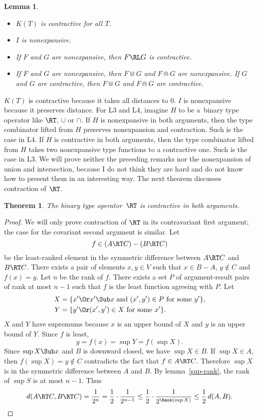 \documentclass{amsart}
\newtheorem{theorem}[subsection]{Theorem}
\newtheorem{lemma}[subsection]{Lemma}
\theoremstyle{definition}
\begin{document}
\begin{samepage}
\begin{lemma}
\label{kisp}
~
\begin{itemize}
\item [L1.] $K(T)$ is contractive for all $T$.
\item [L2.] $I$ is nonexpansive.
\item [L3.] If $F$ and $G$ are nonexpansive, then $F\RL G$ is
contractive.
\item [L4.] If $F$ and $G$ are nonexpansive, then $F\Cup G$ and
$F\Cap G$ are nonexpansive. If $G$ and $G$ are contractive, then
$F\Cup G$ and $F\Cap G$ are contractive.
\end{itemize}
\end{lemma}
\end{samepage}

$K(T)$ is contractive because it takes all distances to 0. $I$ is
nonexpansive because it preserves distance. For L3 and L4,
imagine $H$ to be a~binary type operator like $\RT$, $\cup$ or
$\cap$. If $H$ is nonexpansive in both arguments, then the type
combinator lifted from $H$ preserves nonexpansion and
contraction. Such is the case in L4. If $H$ is contractive in
both arguments, then the type combinator lifted from $H$ takes
two nonexpansive type functions to a contractive one. Such is the
case in L3. We will prove neither the preceding remarks nor the
nonexpansion of union and intersection, because I do not think
they are hard and do not know how to present them in an
interesting way. The next theorem discusses contraction of $\RT$.


\begin{theorem}
\label{contract-fun}
The binary type operator~$\RT$ is contractive in both arguments.
\end{theorem}

\begin{proof}
We will only prove contraction of $\RT$ in its contravariant
first argument; the case for the covariant second argument is
similar. Let
\[
f\in(A\RT C)-(B\RT C)
\]
be the least-ranked element in the symmetric difference between
$A\RT C$ and $B\RT C$. There exists a pair of elements $x,y\in V$
such that $x\in B-A$, $y\notin C$ and $f(x)=y$. Let $n$ be the
rank of $f$. There exists a set $P$ of argument-result pairs of
rank at most $n-1$ such that $f$ is the least function agreeing
with $P$. Let
\begin{align*}
X &= \{x' \Or x'\Sub x\text{ and }(x', y')\in P\text{ for some }y'\},\\
Y &= \{y' \Or (x',y')\in X\text{ for some }x'\}.
\end{align*}
$X$ and $Y$ have supremums because $x$ is an upper bound of $X$
and $y$ is an upper bound of $Y$. Since $f$ is least,
\[
y = f(x) = \sup Y = f(\sup X).
\]
Since $\sup X\Sub x$ and $B$ is downward closed, we have $\sup
X\in B$. If $\sup X\in A$, then $f(\sup X)=y\notin C$ contradicts
the fact that $f\in A\RT C$. Therefore $\sup X$ is in the
symmetric difference between $A$ and $B$. By
lemma~\ref{sup-rank}, the rank of $\sup S$ is at most $n-1$. Thus
\[
d(A\RT C,B\RT C)=\frac1{2^n}=\frac12\cdot\frac1{2^{n-1}}
\le\frac12\cdot\frac1{2^{\Rank(\sup X)}}\le\frac12\,d(A, B).
\]
\end{proof}
\end{document}
